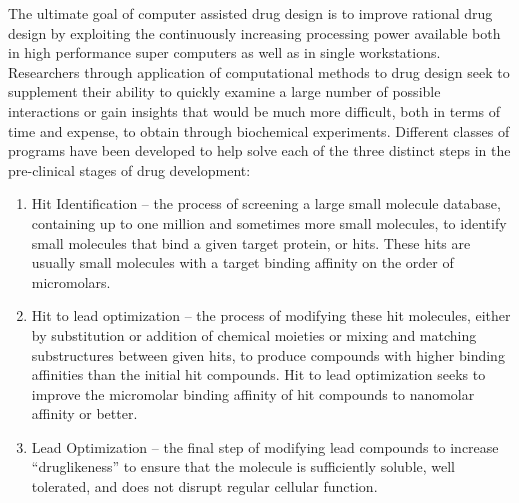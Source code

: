 The ultimate goal of computer assisted drug design is to improve rational drug design by exploiting the continuously increasing processing power available both in high performance super computers as well as in single workstations.
Researchers through application of computational methods to drug design seek to supplement their ability to quickly examine a large number of possible interactions or gain insights that would be much more difficult, both in terms of time and expense, to obtain through biochemical experiments.
Different classes of programs have been developed to help solve each of the three distinct steps in the pre-clinical stages of drug development:
\begin{enumerate}
\item Hit Identification -- the process of screening a large small molecule database, containing up to one million and sometimes more small molecules, to identify small molecules that bind a given target protein, or hits.
These hits are usually small molecules with a target binding affinity on the order of micromolars.
\item Hit to lead optimization -- the process of modifying these hit molecules, either by substitution or addition of chemical moieties or mixing and matching substructures between given hits, to produce compounds with higher binding affinities than the initial hit compounds.
Hit to lead optimization seeks to improve the micromolar binding affinity of hit compounds to nanomolar affinity or better.
\item Lead Optimization -- the final step of modifying lead compounds to increase ``druglikeness'' to ensure that the molecule is sufficiently soluble, well tolerated, and does not disrupt regular cellular function.
\end{enumerate}

